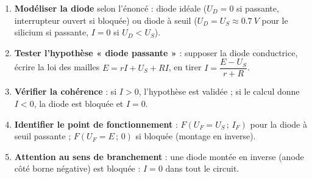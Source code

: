 \documentclass[11pt]{article}
\begin{document}
\begin{methode}
\begin{enumerate}
\item \textbf{Modéliser la diode} selon l'énoncé : diode idéale ($U_D = 0$ si passante, interrupteur ouvert si bloquée) ou diode à seuil ($U_D = U_S \approx \SI{0,7}{V}$ pour le silicium si passante, $I = 0$ si $U_D < U_S$).
\item \textbf{Tester l'hypothèse « diode passante »} : supposer la diode conductrice, écrire la loi des mailles $E = rI + U_S + RI$, en tirer $I = \dfrac{E - U_S}{r + R}$.
\item \textbf{Vérifier la cohérence} : si $I > 0$, l'hypothèse est validée ; si le calcul donne $I < 0$, la diode est bloquée et $I = 0$.
\item \textbf{Identifier le point de fonctionnement} : $F(U_F = U_S\,;\,I_F)$ pour la diode à seuil passante ; $F(U_F = E\,;\,0)$ si bloquée (montage en inverse).
\item \textbf{Attention au sens de branchement} : une diode montée en inverse (anode côté borne négative) est bloquée : $I = 0$ dans tout le circuit.
\end{enumerate}
\end{methode}
\end{document}
